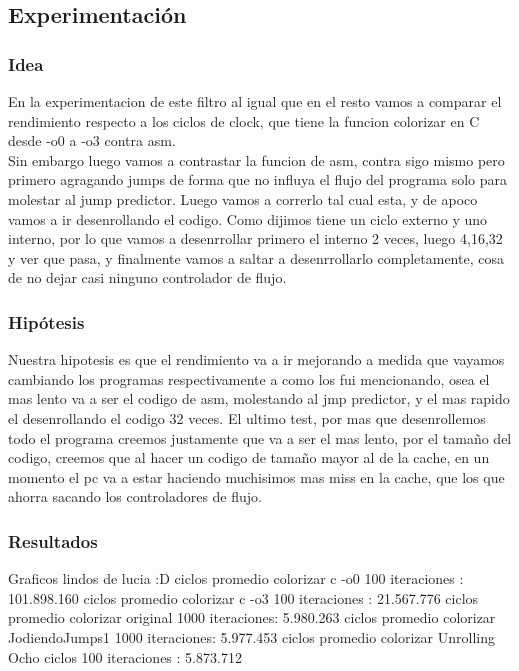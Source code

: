 	
\subsection{Experimentación}
\subsubsection{Idea}	En la experimentacion de este filtro al igual que en el resto vamos a comparar el rendimiento respecto a los ciclos de clock, que tiene la funcion colorizar en C desde -o0 a -o3 contra asm. \\ Sin embargo luego vamos a contrastar la funcion de asm, contra sigo mismo pero primero agragando jumps de forma que no influya el flujo del programa solo para molestar al jump predictor. Luego vamos a correrlo tal cual esta, y de apoco vamos a ir desenrollando el codigo. Como dijimos tiene un ciclo externo y uno interno, por lo que vamos a desenrrollar primero el interno 2 veces, luego 4,16,32 y ver que pasa, y finalmente vamos a saltar a desenrrollarlo completamente, cosa de no dejar casi ninguno controlador de flujo.
	   
\subsubsection{Hipótesis}
	Nuestra hipotesis es que el rendimiento va a ir mejorando a medida que vayamos cambiando los programas respectivamente a como los fui mencionando, osea el mas lento va a ser el codigo de asm, molestando al jmp predictor, y el mas rapido el desenrollando el codigo 32 veces. El ultimo test, por mas que desenrollemos todo el programa creemos justamente que va a ser el mas lento, por el tamaño del codigo, creemos que al hacer un codigo de tamaño mayor al de la cache, en un momento el pc va a estar haciendo muchisimos mas miss en la cache, que los que ahorra sacando los controladores de flujo.
	
	
\subsubsection{Resultados}
	Graficos lindos de lucia :D
	ciclos promedio colorizar c -o0 100 iteraciones : 101.898.160
	ciclos promedio colorizar c -o3 100 iteraciones : 21.567.776
	ciclos promedio colorizar original 1000 iteraciones: 5.980.263
	ciclos promedio colorizar JodiendoJumps1 1000 iteraciones: 5.977.453
	ciclos promedio colorizar Unrolling Ocho ciclos 100 iteraciones : 5.873.712
	
	
	
